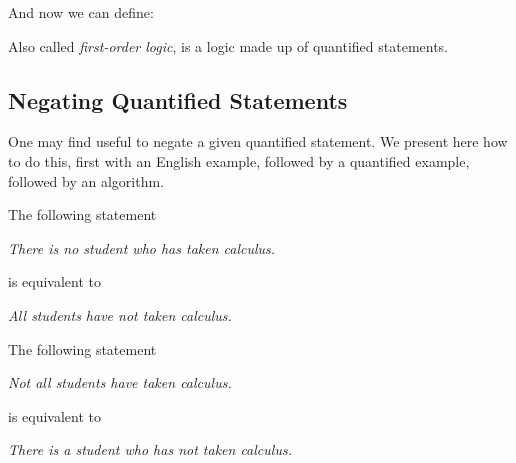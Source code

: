 \documentclass[main.tex]{subfiles}
\begin{document}
And now we can define:

\begin{defn}
	Also called \textit{first-order logic}, is a logic made up of quantified statements.
\end{defn}


\subsection{Negating Quantified Statements}

One may find useful to negate a given quantified statement. We present here how to do this, first with an English example, followed by a quantified example, followed by an algorithm.

\begin{example}
	The following statement
	\begin{center}
		\textit{There is no student who has taken calculus.}
	\end{center}
	is equivalent to
	\begin{center}
		\textit{All students have not taken calculus.}
	\end{center}
\end{example}

\begin{example}
	The following statement
	\begin{center}
		\textit{Not all students have taken calculus.}
	\end{center}
	is equivalent to
	\begin{center}
		\textit{There is a student who has not taken calculus.}
	\end{center}
\end{example}
\end{document}

